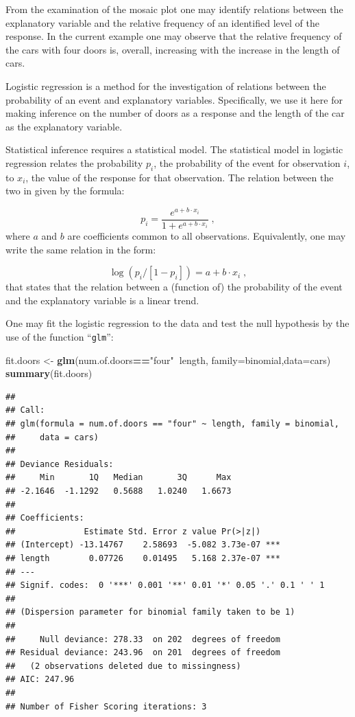 \documentclass[
]{krantz}
\makeatletter
\newenvironment{Shaded}{\begin{snugshade}}{\end{snugshade}}
\newcommand{\DataTypeTok}[1]{\textcolor[rgb]{0.13,0.29,0.53}{#1}}
\newcommand{\KeywordTok}[1]{\textcolor[rgb]{0.13,0.29,0.53}{\textbf{#1}}}
\newcommand{\NormalTok}[1]{#1}
\newcommand{\OperatorTok}[1]{\textcolor[rgb]{0.81,0.36,0.00}{\textbf{#1}}}
\newcommand{\StringTok}[1]{\textcolor[rgb]{0.31,0.60,0.02}{#1}}
\newenvironment{kframe}{%
\medskip{}
\setlength{\fboxsep}{.8em}
 \def\at@end@of@kframe{}%
 \ifinner\ifhmode%
  \def\at@end@of@kframe{\end{minipage}}%
  \begin{minipage}{\columnwidth}%
 \fi\fi%
 \def\FrameCommand##1{\hskip\@totalleftmargin \hskip-\fboxsep
 \colorbox{shadecolor}{##1}\hskip-\fboxsep
     \hskip-\linewidth \hskip-\@totalleftmargin \hskip\columnwidth}%
 \MakeFramed {\advance\hsize-\width
   \@totalleftmargin\z@ \linewidth\hsize
   \@setminipage}}%
 {\par\unskip\endMakeFramed%
 \at@end@of@kframe}
\renewenvironment{Shaded}{\begin{kframe}}{\end{kframe}}
\theoremstyle{definition}
\theoremstyle{definition}
\theoremstyle{definition}
\theoremstyle{remark}
\makeatother
\begin{document}
From the examination of the mosaic plot one may identify relations
between the explanatory variable and the relative frequency of an
identified level of the response. In the current example one may observe
that the relative frequency of the cars with four doors is, overall,
increasing with the increase in the length of cars.

Logistic regression is a method for the investigation of relations
between the probability of an event and explanatory variables.
Specifically, we use it here for making inference on the number of doors
as a response and the length of the car as the explanatory variable.

Statistical inference requires a statistical model. The statistical
model in logistic regression relates the probability \(p_i\), the
probability of the event for observation \(i\), to \(x_i\), the value of the
response for that observation. The relation between the two in given by
the formula:

\[p_i = \frac{e^{a + b \cdot x_i}}{1 + e^{a + b\cdot x_i}}\;,\] where
\(a\) and \(b\) are coefficients common to all observations. Equivalently,
one may write the same relation in the form:

\[\log(p_i/[1-p_i]) = a + b\cdot x_i\;,\] that states that the relation
between a (function of) the probability of the event and the explanatory
variable is a linear trend.

One may fit the logistic regression to the data and test the null
hypothesis by the use of the function ``\texttt{glm}'':

\begin{Shaded}
\begin{Highlighting}[]
\NormalTok{fit.doors <-}\StringTok{ }\KeywordTok{glm}\NormalTok{(num.of.doors}\OperatorTok{==}\StringTok{"four"}\OperatorTok{~}\NormalTok{length, }\DataTypeTok{family=}\NormalTok{binomial,}\DataTypeTok{data=}\NormalTok{cars)}
\KeywordTok{summary}\NormalTok{(fit.doors)}
\end{Highlighting}
\end{Shaded}

\begin{verbatim}
## 
## Call:
## glm(formula = num.of.doors == "four" ~ length, family = binomial, 
##     data = cars)
## 
## Deviance Residuals: 
##     Min       1Q   Median       3Q      Max  
## -2.1646  -1.1292   0.5688   1.0240   1.6673  
## 
## Coefficients:
##              Estimate Std. Error z value Pr(>|z|)    
## (Intercept) -13.14767    2.58693  -5.082 3.73e-07 ***
## length        0.07726    0.01495   5.168 2.37e-07 ***
## ---
## Signif. codes:  0 '***' 0.001 '**' 0.01 '*' 0.05 '.' 0.1 ' ' 1
## 
## (Dispersion parameter for binomial family taken to be 1)
## 
##     Null deviance: 278.33  on 202  degrees of freedom
## Residual deviance: 243.96  on 201  degrees of freedom
##   (2 observations deleted due to missingness)
## AIC: 247.96
## 
## Number of Fisher Scoring iterations: 3
\end{verbatim}
\end{document}
